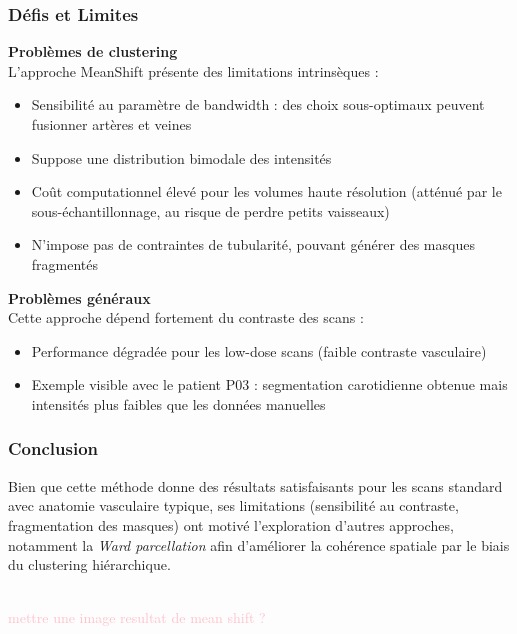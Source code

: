 \documentclass{article}
\begin{document}
        \subsubsection*{Défis et Limites}
            \textbf{Problèmes de clustering}\\
            L'approche MeanShift présente des limitations intrinsèques :
            \begin{itemize}
                \item Sensibilité au paramètre de bandwidth : des choix sous-optimaux peuvent fusionner artères et veines
                \item Suppose une distribution bimodale des intensités
                \item Coût computationnel élevé pour les volumes haute résolution (atténué par le sous-échantillonnage, au risque de perdre petits vaisseaux)
                \item N'impose pas de contraintes de tubularité, pouvant générer des masques fragmentés
            \end{itemize}
            \bigskip

            \textbf{Problèmes généraux}\\
            Cette approche dépend fortement du contraste des scans :
            \begin{itemize}
                \item Performance dégradée pour les low-dose scans (faible contraste vasculaire)
                \item Exemple visible avec le patient P03 : segmentation carotidienne obtenue mais intensités plus faibles que les données manuelles
            \end{itemize}

        \subsubsection*{Conclusion}
            Bien que cette méthode donne des résultats satisfaisants pour les scans standard avec anatomie vasculaire typique, ses limitations (sensibilité au contraste, fragmentation des masques) ont motivé l'exploration d'autres approches, notamment la \textit{Ward parcellation} afin d'améliorer la cohérence spatiale par le biais du clustering hiérarchique.\\
            
            
            \begin{center}\\
                \textcolor{pink}{mettre une image resultat de mean shift ?}
            \end{center}
        
\end{document}
